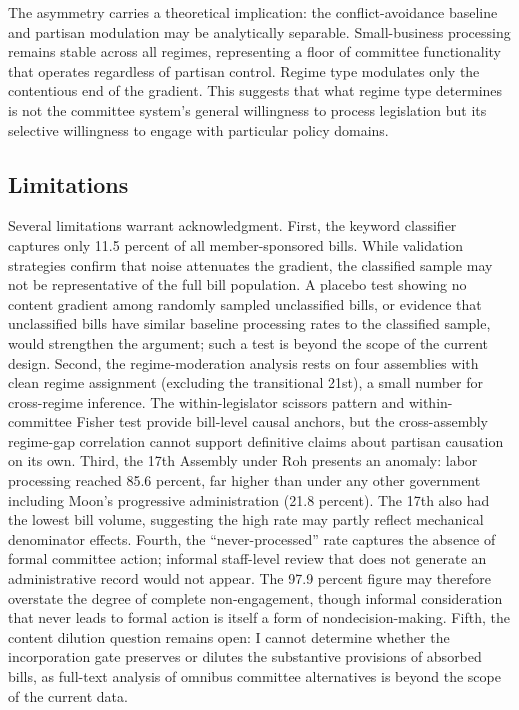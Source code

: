 \documentclass[11pt]{article}
\begin{document}
The asymmetry carries a theoretical implication: the conflict-avoidance baseline and partisan modulation may be analytically separable. Small-business processing remains stable across all regimes, representing a floor of committee functionality that operates regardless of partisan control. Regime type modulates only the contentious end of the gradient. This suggests that what regime type determines is not the committee system's general willingness to process legislation but its selective willingness to engage with particular policy domains.

\subsection*{Limitations}

Several limitations warrant acknowledgment. First, the keyword classifier captures only 11.5 percent of all member-sponsored bills. While validation strategies confirm that noise attenuates the gradient, the classified sample may not be representative of the full bill population. A placebo test showing no content gradient among randomly sampled unclassified bills, or evidence that unclassified bills have similar baseline processing rates to the classified sample, would strengthen the argument; such a test is beyond the scope of the current design. Second, the regime-moderation analysis rests on four assemblies with clean regime assignment (excluding the transitional 21st), a small number for cross-regime inference. The within-legislator scissors pattern and within-committee Fisher test provide bill-level causal anchors, but the cross-assembly regime-gap correlation cannot support definitive claims about partisan causation on its own. Third, the 17th Assembly under Roh presents an anomaly: labor processing reached 85.6 percent, far higher than under any other government including Moon's progressive administration (21.8 percent). The 17th also had the lowest bill volume, suggesting the high rate may partly reflect mechanical denominator effects. Fourth, the ``never-processed'' rate captures the absence of formal committee action; informal staff-level review that does not generate an administrative record would not appear. The 97.9 percent figure may therefore overstate the degree of complete non-engagement, though informal consideration that never leads to formal action is itself a form of nondecision-making. Fifth, the content dilution question remains open: I cannot determine whether the incorporation gate preserves or dilutes the substantive provisions of absorbed bills, as full-text analysis of omnibus committee alternatives is beyond the scope of the current data.
\end{document}
